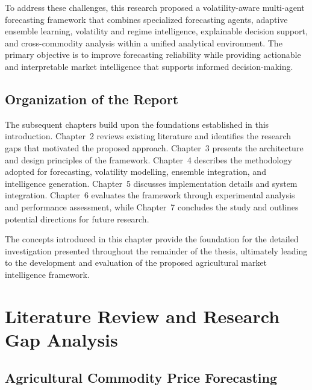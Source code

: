 \documentclass[12pt,a4paper]{report}
\theoremstyle{definition}
\theoremstyle{remark}
\begin{document}
To address these challenges, this research proposed a volatility-aware multi-agent forecasting framework that combines specialized forecasting agents, adaptive ensemble learning, volatility and regime intelligence, explainable decision support, and cross-commodity analysis within a unified analytical environment. The primary objective is to improve forecasting reliability while providing actionable and interpretable market intelligence that supports informed decision-making.

\section{Organization of the Report}
The subsequent chapters build upon the foundations established in this introduction. Chapter~2 reviews existing literature and identifies the research gaps that motivated the proposed approach. Chapter~3 presents the architecture and design principles of the framework. Chapter~4 describes the methodology adopted for forecasting, volatility modelling, ensemble integration, and intelligence generation. Chapter~5 discusses implementation details and system integration. Chapter~6 evaluates the framework through experimental analysis and performance assessment, while Chapter~7 concludes the study and outlines potential directions for future research.

The concepts introduced in this chapter provide the foundation for the detailed investigation presented throughout the remainder of the thesis, ultimately leading to the development and evaluation of the proposed agricultural market intelligence framework.


\chapter{Literature Review and Research Gap Analysis}

\section{Agricultural Commodity Price Forecasting}
\end{document}
